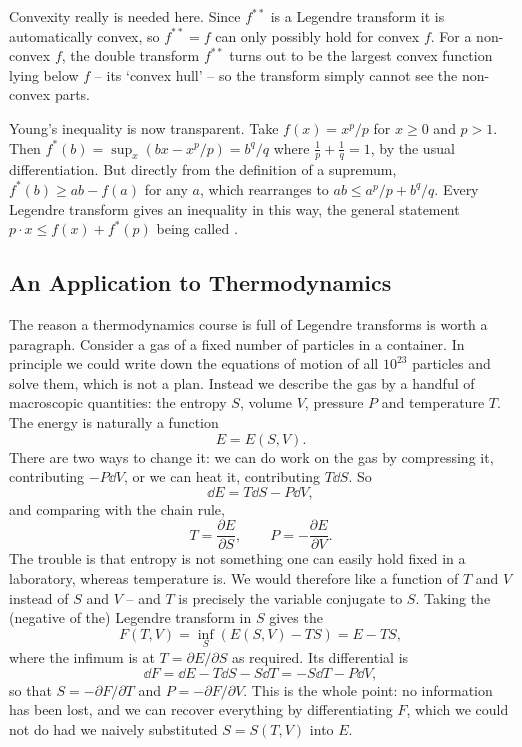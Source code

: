 Convexity really is needed here. Since $f^{**}$ is a Legendre transform it is automatically convex, so $f^{**} = f$ can only possibly hold for convex $f$. For a non-convex $f$, the double transform $f^{**}$ turns out to be the largest convex function lying below $f$ -- its `convex hull' -- so the transform simply cannot see the non-convex parts.

\begin{remark}
	Young's inequality is now transparent. Take $f(x) = x^p/p$ for $x \geq 0$ and $p > 1$. Then $f^*(b) = \sup_x(bx - x^p/p) = b^q/q$ where $\frac 1p + \frac 1q = 1$, by the usual differentiation. But directly from the definition of a supremum, $f^*(b) \geq ab - f(a)$ for any $a$, which rearranges to $ab \leq a^p/p + b^q/q$. Every Legendre transform gives an inequality in this way, the general statement $p\cdot x \leq f(x) + f^*(p)$ being called .
\end{remark}

\subsection{An Application to Thermodynamics}

The reason a thermodynamics course is full of Legendre transforms is worth a paragraph. Consider a gas of a fixed number of particles in a container. In principle we could write down the equations of motion of all $10^{23}$ particles and solve them, which is not a plan. Instead we describe the gas by a handful of macroscopic quantities: the entropy $S$, volume $V$, pressure $P$ and temperature $T$. The energy is naturally a function
$$
E = E(S, V).
$$
There are two ways to change it: we can do work on the gas by compressing it, contributing $-P\dd V$, or we can heat it, contributing $T \dd S$. So
$$
\dd E = T \dd S - P \dd V,
$$
and comparing with the chain rule,
$$
T = \frac{\partial E}{\partial S}, \qquad P = -\frac{\partial E}{\partial V}.
$$
The trouble is that entropy is not something one can easily hold fixed in a laboratory, whereas temperature is. We would therefore like a function of $T$ and $V$ instead of $S$ and $V$ -- and $T$ is precisely the variable conjugate to $S$. Taking the (negative of the) Legendre transform in $S$ gives the 
$$
F(T, V) = \inf_S\left(E(S, V) - TS\right) = E - TS,
$$
where the infimum is at $T = \partial E/\partial S$ as required. Its differential is
$$
\dd F = \dd E - T \dd S - S \dd T = -S\dd T - P \dd V,
$$
so that $S = -\partial F/\partial T$ and $P = -\partial F /\partial V$. This is the whole point: no information has been lost, and we can recover everything by differentiating $F$, which we could not do had we naively substituted $S = S(T, V)$ into $E$.

